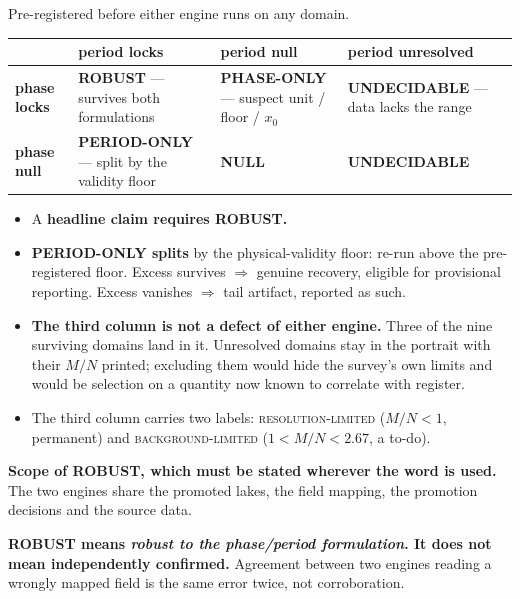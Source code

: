 \documentclass[11pt, letterpaper, openany]{book}
\begin{document}
Pre-registered before either engine runs on any domain.

\begin{table}[H]
\centering
\small
\begin{tabular}{@{}lp{}p{}p{}@{}}
\toprule
& \textbf{period locks} & \textbf{period null} & \textbf{period unresolved} \\
\midrule
\textbf{phase locks} &
\cellcolor{signalgreen!12}\textbf{ROBUST} --- survives both formulations &
\cellcolor{goldseal!12}\textbf{PHASE-ONLY} --- suspect unit / floor / $x_0$ &
\cellcolor{gray!12}\textbf{UNDECIDABLE} --- data lacks the range \\
\textbf{phase null} &
\cellcolor{goldseal!12}\textbf{PERIOD-ONLY} --- split by the validity floor &
\cellcolor{gray!8}\textbf{NULL} &
\cellcolor{gray!12}\textbf{UNDECIDABLE} \\
\bottomrule
\end{tabular}
\end{table}

\begin{itemize}
    \item A \textbf{headline claim requires ROBUST.}
    \item \textbf{PERIOD-ONLY splits} by the physical-validity floor: re-run above the
          pre-registered floor. Excess survives $\Rightarrow$ genuine recovery, eligible for
          provisional reporting. Excess vanishes $\Rightarrow$ tail artifact, reported as such.
    \item \textbf{The third column is not a defect of either engine.} Three of the nine surviving
          domains land in it. Unresolved domains stay in the portrait with their $M/N$ printed;
          excluding them would hide the survey's own limits and would be selection on a quantity
          now known to correlate with register.
    \item The third column carries two labels: \textsc{resolution-limited} ($M/N < 1$, permanent)
          and \textsc{background-limited} ($1 < M/N < 2.67$, a to-do).
\end{itemize}

\begin{warningbox}
\textbf{Scope of ROBUST, which must be stated wherever the word is used.} The two engines share
the promoted lakes, the field mapping, the promotion decisions and the source data.

\medskip
\noindent \textbf{ROBUST means \emph{robust to the phase/period formulation}. It does not mean
independently confirmed.} Agreement between two engines reading a wrongly mapped field is the
same error twice, not corroboration.
\end{warningbox}
\end{document}
